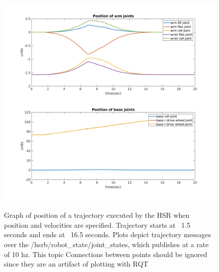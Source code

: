 \documentclass[12pt]{article}
\begin{document}
        \begin{figure}
            \centering
            \includegraphics[width=\linewidth]{2020.04.01/pos_joints.png}
            \label{fig:posjoints}
            \caption{Graph of position of a trajectory executed by the HSR when position and velocities are specified. Trajectory starts at ~1.5 seconds and ends at ~16.5 seconds. Plots depict trajectory messages over the /hsrb/robot\_state/joint\_states, which publishes at a rate of 10 hz. This topic Connections between points should be ignored since they are an artifact of plotting with RQT}
        \end{figure}
\end{document}
